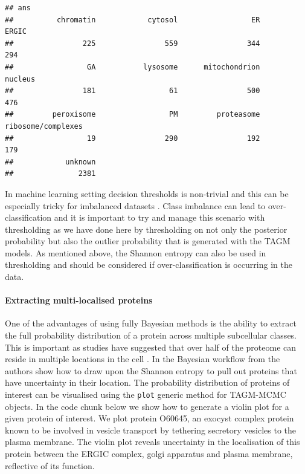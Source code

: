 \documentclass[9pt,a4paper,]{extarticle}
\begin{document}
\begin{verbatim}
## ans
##          chromatin            cytosol                 ER              ERGIC 
##                225                559                344                294 
##                 GA           lysosome      mitochondrion            nucleus 
##                181                 61                500                476 
##         peroxisome                 PM         proteasome ribosome/complexes 
##                 19                290                192                179 
##            unknown 
##               2381
\end{verbatim}

In machine learning setting decision thresholds is non-trivial and this can
be especially tricky for imbalanced datasets \citep{Chen2024}. Class imbalance
can lead to over-classification and it is important to try and manage this
scenario with thresholding as we have done here by thresholding on not only
the posterior probability but also the outlier probability that is generated
with the TAGM models. As mentioned above, the Shannon entropy can also be
used in thresholding and should be considered if over-classification is
occurring in the data.

\paragraph{Extracting multi-localised proteins}\label{extracting-multi-localised-proteins}

One of the advantages of using fully Bayesian methods is the ability to extract
the full probability distribution of a protein across multiple subcellular classes.
This is important as studies have suggested that over half of the proteome can reside in
multiple locations in the cell \citep{Thul2017}. In the Bayesian workflow from \citet{Crook2019}
the authors show how to draw upon the Shannon entropy to pull out proteins that
have uncertainty in their location. The probability distribution of proteins of
interest can be visualised using the \texttt{plot} generic method for
TAGM-MCMC objects. In the code chunk below we show how to generate a violin plot
for a given protein of interest. We plot protein O60645, an
exocyst complex protein known to be involved in vesicle transport by tethering
secretory vesicles to the plasma membrane. The violin plot reveals uncertainty
in the localisation of this protein between the ERGIC complex, golgi apparatus
and plasma membrane, reflective of its function.
\end{document}
